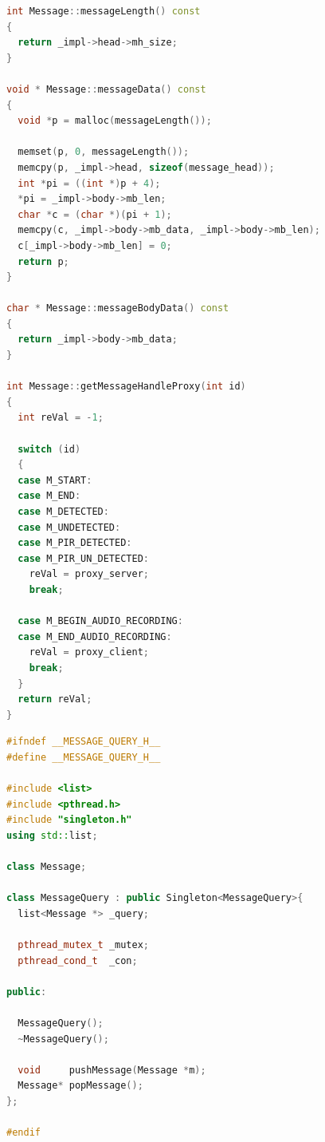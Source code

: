 \documentclass[11pt,a4paper,titlepage]{report}
\begin{document}
\begin{lstlisting}[caption=message.cpp,language=C++]
int Message::messageLength() const
{
  return _impl->head->mh_size;
}

void * Message::messageData() const
{
  void *p = malloc(messageLength());

  memset(p, 0, messageLength());
  memcpy(p, _impl->head, sizeof(message_head));
  int *pi = ((int *)p + 4);
  *pi = _impl->body->mb_len;
  char *c = (char *)(pi + 1);
  memcpy(c, _impl->body->mb_data, _impl->body->mb_len);
  c[_impl->body->mb_len] = 0;
  return p;
}

char * Message::messageBodyData() const
{
  return _impl->body->mb_data;
}

int Message::getMessageHandleProxy(int id)
{
  int reVal = -1;

  switch (id)
  {
  case M_START:
  case M_END:
  case M_DETECTED:
  case M_UNDETECTED:
  case M_PIR_DETECTED:
  case M_PIR_UN_DETECTED:
    reVal = proxy_server;
    break;

  case M_BEGIN_AUDIO_RECORDING:
  case M_END_AUDIO_RECORDING:
    reVal = proxy_client;
    break;
  }
  return reVal;
}
\end{lstlisting}







\begin{lstlisting}[caption={message\_query.h},language=C++]
#ifndef __MESSAGE_QUERY_H__
#define __MESSAGE_QUERY_H__

#include <list>
#include <pthread.h>
#include "singleton.h"
using std::list;

class Message;

class MessageQuery : public Singleton<MessageQuery>{
  list<Message *> _query;

  pthread_mutex_t _mutex;
  pthread_cond_t  _con;

public:

  MessageQuery();
  ~MessageQuery();

  void     pushMessage(Message *m);
  Message* popMessage();
};

#endif
\end{lstlisting}
\end{document}
